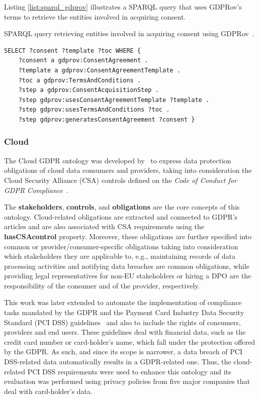 Listing \ref{list:sparql_gdprov} illustrates a SPARQL query that uses GDPRov's terms to retrieve the entities involved in acquiring consent.

\begin{listing}
\caption{SPARQL query retrieving entities involved in acquiring consent using GDPRov~\citep{pandit_modelling_2017}.}
\label{list:sparql_gdprov}
\begin{verbatim}
SELECT ?consent ?template ?toc WHERE {
    ?consent a gdprov:ConsentAgreement .
    ?template a gdprov:ConsentAgreementTemplate .
    ?toc a gdprov:TermsAndConditions .
    ?step a gdprov:ConsentAcquisitionStep .
    ?step gdprov:usesConsentAgreementTemplate ?template .
    ?step gdprov:usesTermsAndConditions ?toc .
    ?step gdprov:generatesConsentAgreement ?consent }
\end{verbatim}
\end{listing}

\subsubsection{Cloud}
\label{sec:cloud}

The Cloud GDPR ontology was developed by~\cite{elluri_knowledge_2018} to express data protection obligations of cloud data consumers and providers, taking into consideration the Cloud Security Alliance (CSA) controls defined on the \textit{Code of Conduct for GDPR Compliance}~\citep{cloud_security_alliance_-_privacy_level_agreement_working_group_code_2017}.

The \textbf{stakeholders}, \textbf{controls}, and \textbf{obligations} are the core concepts of this ontology.
Cloud-related obligations are extracted and connected to GDPR's articles and are also associated with CSA requirements using the \textbf{hasCSAcontrol} property.
Moreover, these obligations are further specified into common or provider/consumer-specific obligations taking into consideration which stakeholders they are applicable to, e.g., maintaining records of data processing activities and notifying data breaches are common obligations, while providing legal representatives for non-EU stakeholders or hiring a DPO are the responsibility of the consumer and of the provider, respectively.

This work was later extended \citep{elluri_integrated_2018} to automate the implementation of compliance tasks mandated by the GDPR and the Payment Card Industry Data Security Standard (PCI DSS) guidelines~\citep{pci_security_standards_council_payment_2018} and also to include the rights of consumers, providers and end users.
These guidelines deal with financial data, such as the credit card number or card-holder's name, which fall under the protection offered by the GDPR.
As such, and since its scope is narrower, a data breach of PCI DSS-related data automatically results in a GDPR-related one.
Thus, the cloud-related PCI DSS requirements were used to enhance this ontology and its evaluation was performed using privacy policies from five major companies that deal with card-holder's data.

